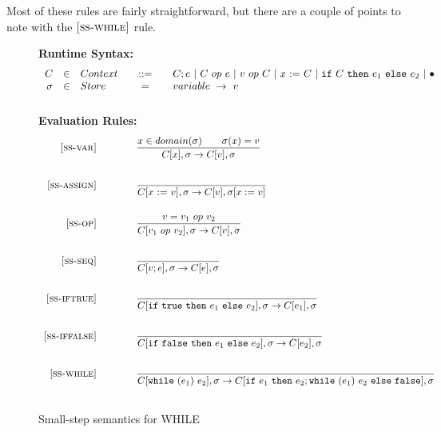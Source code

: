 \documentclass{article}
\newcommand{\rel}[1]{ \mbox{\sc [#1]} }
\begin{document}
Most of these rules are fairly straightforward, but there are a couple of points
to note with the $\rel{ss-while}$ rule.


\begin{figure}[H]\label{fig:smallstep}
\caption{Small-step semantics for WHILE}
{\bf Runtime Syntax:}
\[
\begin{array}{rclcl}
  C & \in & {Context} \quad & ::= & \quad C; e
        ~|~ C ~op~ e
        ~|~ v ~op~ C
        ~|~ x~{:=}~C
        ~|~ \mbox{\tt if}~{C}~\mbox{\tt then}~{e_1}~\mbox{\tt else}~{e_2}
        ~|~ \bullet \\
  \sigma & \in & {Store} \quad  & = & \quad {variable} ~\rightarrow ~v \\
  \\
\end{array}
\]
{\bf Evaluation Rules:~~~ } \\
\[
\begin{array}{r@{\qquad\qquad}l}
\ssrule{ss-var}{
  x \in domain(\sigma) \qquad \sigma(x)=v
}{
  \sstep{x}{\sigma}{v}{\sigma}
}
\ssrule{ss-assign}{
}{
  \sstep{\assign{x}{v}}{\sigma}{v}{\sigma[x:=v]}
}
\ssrule{ss-op}{
  v = v_1 ~op~ v_2
}{
  \sstep{v_1~op~v_2}{\sigma}{v}{\sigma}
}
\ssrule{ss-seq}{
}{
  \sstep{v;e}{\sigma}{e}{\sigma}
}
\ssrule{ss-iftrue}{
}{
  \sstep{\ife{\true}{e_1}{e_2}}{\sigma}{e_1}{\sigma}
}
\ssrule{ss-iffalse}{
}{
  \sstep{\ife{\false}{e_1}{e_2}}{\sigma}{e_2}{\sigma}
}
\ssrule{ss-while}{
}{
  \sstep{\whilee{e_1}{e_2}}{\sigma}{\ife{e_1}{e_2;\whilee{e_1}{e_2}}{\false}}{\sigma}
}
\end{array}
\]
\end{figure}
\end{document}
